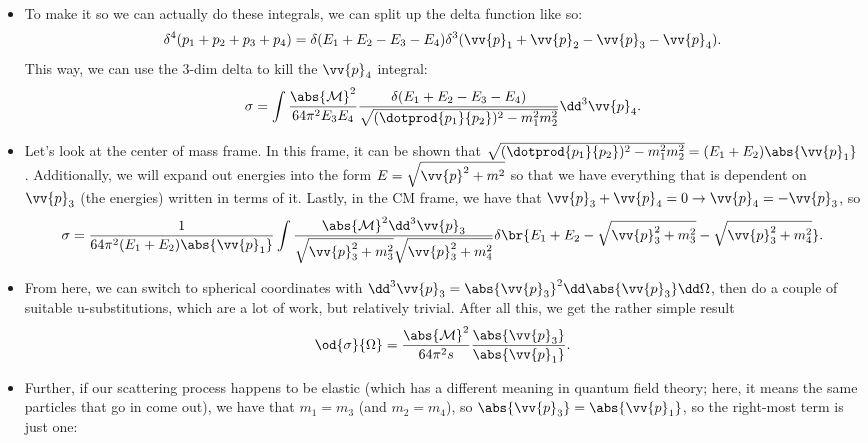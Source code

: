 \begin{itemize}
\begin{align*}
        \end{align*}
    \item To make it so we can actually do these integrals, we can split up the delta function like so:
        \begin{equation*}
            \delta^4(p_1 + p_2 + p_3 + p_4) = \delta(E_1 + E_2 - E_3 - E_4)\delta^3(\vv{p}_1 + \vv{p}_2 - \vv{p}_3 - \vv{p}_4).
        \end{equation*}
        This way, we can use the 3-dim delta to kill the $\vv{p}_4$ integral:
        \begin{equation*}
            \sigma = \int \frac{\abs{\mathcal{M}}^2}{64\pi^2 E_3E_4} \frac{\delta(E_1 + E_2 - E_3 - E_4)}{\sqrt{(\dotprod{p_1}{p_2})^2 - m_1^2m_2^2}} \dd^3\vv{p}_4.
        \end{equation*}
    \item Let's look at the center of mass frame. In this frame, it can be shown that $\sqrt{(\dotprod{p_1}{p_2})^2 - m_1^2m_2^2} = (E_1 + E_2)\abs{\vv{p}_1}$. Additionally, we will expand out energies into the form $E = \sqrt{\vv{p}^2 + m^2}$ so that we have everything that is dependent on $\vv{p}_3$ (the energies) written in terms of it. Lastly, in the CM frame, we have that $\vv{p}_3 + \vv{p}_4 = 0 \rightarrow \vv{p}_4 = -\vv{p}_3$, so
        \begin{equation*}
            \sigma = \frac{1}{64\pi^2 (E_1+E_2)\abs{\vv{p}_1}} \int \frac{\abs{\mathcal{M}}^2 \dd^3\vv{p}_3}{\sqrt{\vv{p}_3^2 + m_3^2}\sqrt{\vv{p}_3^2 + m_4^2}} \delta\br{E_1 + E_2 - \sqrt{\vv{p}_3^2 + m_3^2} - \sqrt{\vv{p}_3^2 + m_4^2}}.
        \end{equation*}
    \item From here, we can switch to spherical coordinates with $\dd^3\vv{p}_3 = \abs{\vv{p}_3}^2 \dd\abs{\vv{p}_3}\dd\Omega$, then do a couple of suitable u-substitutions, which are a lot of work, but relatively trivial. After all this, we get the rather simple result
        \begin{equation}
            \od{\sigma}{\Omega} = \frac{\abs{\mathcal{M}}^2}{64\pi^2 s}\frac{\abs{\vv{p}_3}}{\abs{\vv{p}_1}}.
        \end{equation}
    \item Further, if our scattering process happens to be elastic (which has a different meaning in quantum field theory; here, it means the same particles that go in come out), we have that $m_1 = m_3$ (and $m_2 = m_4$), so $\abs{\vv{p}_3} = \abs{\vv{p}_1}$, so the right-most term is just one:
        \begin{equation}

\end{equation}
\end{itemize}
